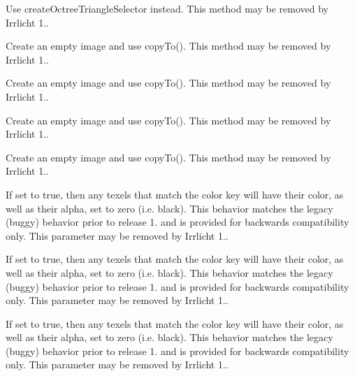 \begin{DoxyRefList}
Use create\+Octree\+Triangle\+Selector instead. This method may be removed by Irrlicht 1..  
\item[\label{deprecated__deprecated000024}%
\Hypertarget{deprecated__deprecated000024}%
Member \hyperlink{classirr_1_1video_1_1IVideoDriver_aa06059abf33e473d7af77e1fbc2b0f75}{irr\+:\+:video\+:\+:I\+Video\+Driver\+:\+:create\+Image} (\hyperlink{classirr_1_1video_1_1IImage}{I\+Image} $\ast$image\+To\+Copy, const core\+::position2d$<$ s32 $>$ \&pos, const core\+::dimension2d$<$ u32 $>$ \&size)=0]Create an empty image and use copy\+To(). This method may be removed by Irrlicht 1.. 

Create an empty image and use copy\+To(). This method may be removed by Irrlicht 1..  
\item[\label{deprecated__deprecated000023}%
\Hypertarget{deprecated__deprecated000023}%
Member \hyperlink{classirr_1_1video_1_1IVideoDriver_af92ef735bc8c755f5c201a52a70d05e8}{irr\+:\+:video\+:\+:I\+Video\+Driver\+:\+:create\+Image} (E\+C\+O\+L\+O\+R\+\_\+\+F\+O\+R\+M\+AT format, \hyperlink{classirr_1_1video_1_1IImage}{I\+Image} $\ast$image\+To\+Copy)=0]Create an empty image and use copy\+To(). This method may be removed by Irrlicht 1.. 

Create an empty image and use copy\+To(). This method may be removed by Irrlicht 1..  
\item[\label{deprecated__deprecated000021}%
\Hypertarget{deprecated__deprecated000021}%
Member \hyperlink{classirr_1_1video_1_1IVideoDriver_a701e7d2101eb26888f57928134bc2ffb}{irr\+:\+:video\+:\+:I\+Video\+Driver\+:\+:make\+Color\+Key\+Texture} (\hyperlink{classirr_1_1video_1_1ITexture}{video\+::\+I\+Texture} $\ast$texture, \hyperlink{classirr_1_1video_1_1SColor}{video\+::\+S\+Color} color, bool zero\+Texels=false) const =0]If set to true, then any texels that match the color key will have their color, as well as their alpha, set to zero (i.\+e. black). This behavior matches the legacy (buggy) behavior prior to release 1. and is provided for backwards compatibility only. This parameter may be removed by Irrlicht 1.. 

If set to true, then any texels that match the color key will have their color, as well as their alpha, set to zero (i.\+e. black). This behavior matches the legacy (buggy) behavior prior to release 1. and is provided for backwards compatibility only. This parameter may be removed by Irrlicht 1..  
\item[\label{deprecated__deprecated000022}%
\Hypertarget{deprecated__deprecated000022}%
Member \hyperlink{classirr_1_1video_1_1IVideoDriver_aed772902f4fe1185b44ce81b9b0b9add}{irr\+:\+:video\+:\+:I\+Video\+Driver\+:\+:make\+Color\+Key\+Texture} (\hyperlink{classirr_1_1video_1_1ITexture}{video\+::\+I\+Texture} $\ast$texture, core\+::position2d$<$ s32 $>$ color\+Key\+Pixel\+Pos, bool zero\+Texels=false) const =0]If set to true, then any texels that match the color key will have their color, as well as their alpha, set to zero (i.\+e. black). This behavior matches the legacy (buggy) behavior prior to release 1. and is provided for backwards compatibility only. This parameter may be removed by Irrlicht 1.. 


\end{DoxyRefList}
